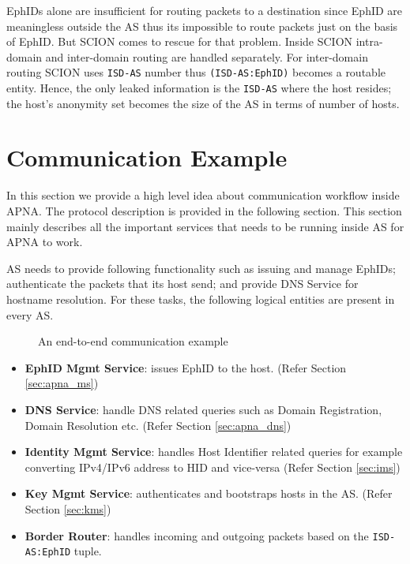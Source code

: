 EphIDs alone are insufficient for routing packets to a destination since EphID are meaningless outside the AS thus its impossible to route packets just on the basis of EphID. But SCION comes to rescue for that problem. Inside SCION intra-domain and inter-domain routing are handled separately. For inter-domain routing SCION uses \texttt{ISD-AS} number thus \texttt{(ISD-AS:EphID)} becomes a routable entity. Hence, the only leaked information is the \texttt{ISD-AS} where the host resides; the host's anonymity set becomes the size of the AS in terms of number of hosts.

\section{Communication Example} \label{sec:comm}
In this section we provide a high level idea about communication workflow inside APNA. The protocol description is provided in the following section. This section mainly describes all the important services that needs to be running inside AS for APNA to work.

AS needs to provide following functionality such as issuing and manage EphIDs; authenticate the packets that its host send; and provide DNS Service for hostname resolution. For these tasks, the following logical entities are present in every AS.

\begin{figure}[th!!]
\centering
\noindent
{}
\decoRule
\caption[APNA End-to-end communication]{An end-to-end communication example}
\label{fig:end_to_end_comm_apna}
\end{figure}

\begin{itemize}
    \item \textbf{EphID Mgmt Service}: issues EphID to the host. (Refer Section \ref{sec:apna_ms})
    \item \textbf{DNS Service}: handle DNS related queries such as Domain Registration, Domain Resolution etc. (Refer Section \ref{sec:apna_dns})
    \item \textbf{Identity Mgmt Service}: handles Host Identifier related queries for example converting IPv4/IPv6 address to HID and vice-versa (Refer Section \ref{sec:ims})
    \item \textbf{Key Mgmt Service}: authenticates and bootstraps hosts in the AS. (Refer Section \ref{sec:kms})
    \item \textbf{Border Router}: handles incoming and outgoing packets based on the \texttt{ISD-AS:EphID} tuple.
\end{itemize}

